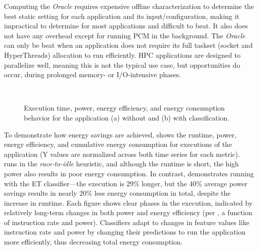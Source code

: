 Computing the \emph{Oracle} requires expensive offline characterization to determine the best static setting for each application and its input/configuration, making it impractical to determine for most applications and difficult to beat.
It also does not have any overhead except for running PCM in the background.
The \emph{Oracle} can only be beat when an application does not require its full taskset (socket and HyperThreads) allocation to run efficiently.
HPC applications are designed to parallelize well, meaning this is not the typical use case, but opportunities do occur, \eg during prolonged memory- or I/O-intensive phases.

\begin{figure}[t]
  \centering
  \subfloat[\app{HipMer} in naive static \emph{race-to-idle} heuristic.]
  {\centering 
  \label{fig:ts-hipmer-dvfs}
  }
  \\
  \subfloat[\app{HipMer} with ET classifier at 5 second intervals.]
  {\centering 
  \label{fig:ts-hipmer-all-et}
  }
  \caption{Execution time, power, energy efficiency, and energy consumption behavior for the  application (a) without and (b) with classification.}
  \label{fig:ts-hipmer}
\end{figure}

To demonstrate how energy savings are achieved,  shows the runtime, power, energy efficiency, and cumulative energy consumption for executions of the  application (Y values are normalized across both time series for each metric).
 runs  in the \emph{race-to-idle} heuristic, and although the runtime is short, the high power also results in poor energy consumption.
In contrast,  demonstrates running with the ET classifier---the execution is 29\% longer, but the 40\% average power savings results in nearly 20\% less energy consumption in total, despite the increase in runtime.
Each figure shows clear phases in the execution, indicated by relatively long-term changes in both power and energy efficiency (per , a function of instruction rate and power).
Classifiers adapt to changes in feature values like instruction rate and power by changing their predictions to run the application more efficiently, thus decreasing total energy consumption.


